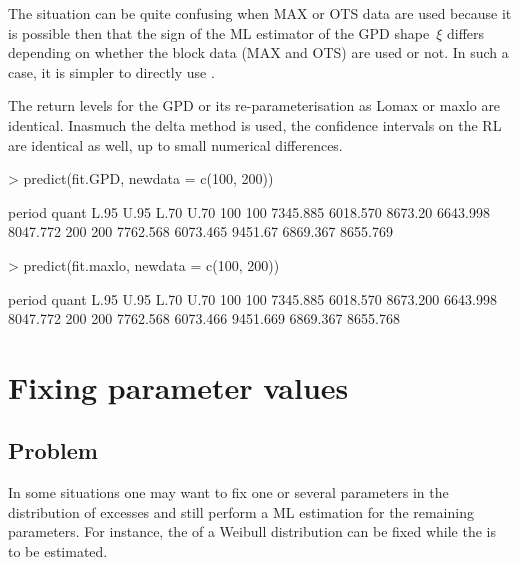 \documentclass[a4paper]{report}
\begin{document}
\noindent
The situation can be quite confusing  when MAX or OTS data are
used because it is possible then that the sign of the ML estimator of
the GPD shape~$\xi$ differs depending on whether the block data (MAX
and OTS) are used or not.  In such a case, it is simpler to directly use
\verb@GPD@.

The return levels for the GPD or its re-parameterisation as Lomax or
maxlo are identical. Inasmuch the delta method is used, the confidence
intervals on the RL are identical as well, up to small 
numerical differences.

\begin{Schunk}
\begin{Sinput}
> predict(fit.GPD, newdata = c(100, 200))
\end{Sinput}
\begin{Soutput}
    period    quant     L.95    U.95     L.70     U.70
100    100 7345.885 6018.570 8673.20 6643.998 8047.772
200    200 7762.568 6073.465 9451.67 6869.367 8655.769
\end{Soutput}
\begin{Sinput}
> predict(fit.maxlo, newdata = c(100, 200))
\end{Sinput}
\begin{Soutput}
    period    quant     L.95     U.95     L.70     U.70
100    100 7345.885 6018.570 8673.200 6643.998 8047.772
200    200 7762.568 6073.466 9451.669 6869.367 8655.768
\end{Soutput}
\end{Schunk}



\section{Fixing parameter values}


\subsection{Problem}
In some situations one may want to fix one or several parameters in the
distribution of excesses and still perform a ML estimation for
the remaining parameters. For instance, the \verb@shape@ of a Weibull 
distribution can be fixed while the \verb@scale@ is to be estimated.
\end{document}
